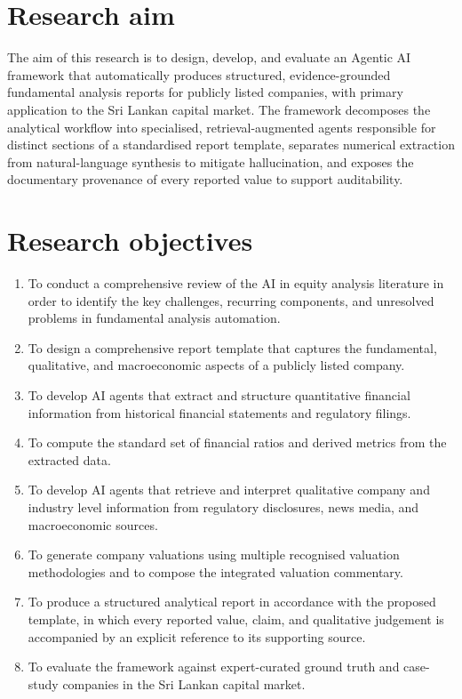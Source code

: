 \section{Research aim}

The aim of this research is to design, develop, and evaluate an Agentic AI framework that automatically produces structured, evidence-grounded fundamental analysis reports for publicly listed companies, with primary application to the Sri Lankan capital market. The framework decomposes the analytical workflow into specialised, retrieval-augmented agents responsible for distinct sections of a standardised report template, separates numerical extraction from natural-language synthesis to mitigate hallucination, and exposes the documentary provenance of every reported value to support auditability.

\section{Research objectives}
\begin{enumerate}[label=\textbf{RO\arabic*:}, leftmargin=3.2em]
    \item To conduct a comprehensive review of the AI in equity analysis literature in order to identify the key challenges, recurring components, and unresolved problems in fundamental analysis automation.
    \item To design a comprehensive report template that captures the fundamental, qualitative, and macroeconomic aspects of a publicly listed company.
    \item To develop AI agents that extract and structure quantitative financial information from historical financial statements and regulatory filings.
    \item To compute the standard set of financial ratios and derived metrics from the extracted data.
    \item To develop AI agents that retrieve and interpret qualitative company and industry level information from regulatory disclosures, news media, and macroeconomic sources.
    \item To generate company valuations using multiple recognised valuation methodologies and to compose the integrated valuation commentary.
    \item To produce a structured analytical report in accordance with the proposed template, in which every reported value, claim, and qualitative judgement is accompanied by an explicit reference to its supporting source.
    \item To evaluate the framework against expert-curated ground truth and case-study companies in the Sri Lankan capital market.
\end{enumerate}


